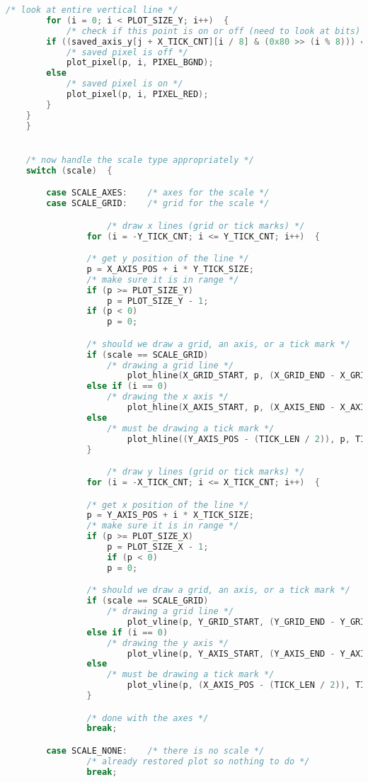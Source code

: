 \begin{lstlisting}[language=C]
	    /* look at entire vertical line */
	    for (i = 0; i < PLOT_SIZE_Y; i++)  {
	        /* check if this point is on or off (need to look at bits) */
		if ((saved_axis_y[j + X_TICK_CNT][i / 8] & (0x80 >> (i % 8))) == 0)
		    /* saved pixel is off */
		    plot_pixel(p, i, PIXEL_BGND);
		else
		    /* saved pixel is on */
		    plot_pixel(p, i, PIXEL_RED);
	    }
	}
    }


    /* now handle the scale type appropriately */
    switch (scale)  {

    	case SCALE_AXES:    /* axes for the scale */
    	case SCALE_GRID:    /* grid for the scale */

		            /* draw x lines (grid or tick marks) */
			    for (i = -Y_TICK_CNT; i <= Y_TICK_CNT; i++)  {

				/* get y position of the line */
				p = X_AXIS_POS + i * Y_TICK_SIZE;
				/* make sure it is in range */
				if (p >= PLOT_SIZE_Y)
				    p = PLOT_SIZE_Y - 1;
				if (p < 0)
				    p = 0;

				/* should we draw a grid, an axis, or a tick mark */
				if (scale == SCALE_GRID)
				    /* drawing a grid line */
			            plot_hline(X_GRID_START, p, (X_GRID_END - X_GRID_START));
				else if (i == 0)
				    /* drawing the x axis */
			            plot_hline(X_AXIS_START, p, (X_AXIS_END - X_AXIS_START));
				else
				    /* must be drawing a tick mark */
			            plot_hline((Y_AXIS_POS - (TICK_LEN / 2)), p, TICK_LEN);
			    }

		            /* draw y lines (grid or tick marks) */
			    for (i = -X_TICK_CNT; i <= X_TICK_CNT; i++)  {

				/* get x position of the line */
				p = Y_AXIS_POS + i * X_TICK_SIZE;
				/* make sure it is in range */
				if (p >= PLOT_SIZE_X)
				    p = PLOT_SIZE_X - 1;
			        if (p < 0)
				    p = 0;

				/* should we draw a grid, an axis, or a tick mark */
				if (scale == SCALE_GRID)
				    /* drawing a grid line */
			            plot_vline(p, Y_GRID_START, (Y_GRID_END - Y_GRID_START));
				else if (i == 0)
				    /* drawing the y axis */
			            plot_vline(p, Y_AXIS_START, (Y_AXIS_END - Y_AXIS_START));
				else
				    /* must be drawing a tick mark */
			            plot_vline(p, (X_AXIS_POS - (TICK_LEN / 2)), TICK_LEN);
			    }

			    /* done with the axes */
			    break;

        case SCALE_NONE:    /* there is no scale */
			    /* already restored plot so nothing to do */
			    break;


\end{lstlisting}
